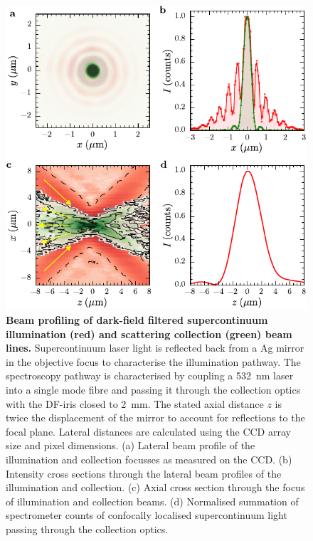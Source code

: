 \documentclass{article}
\begin{document}
\begin{figure}[bt]
\centering
\includegraphics{figures/beam_profile}
\caption[Beam profiling of supercontinuum illumination and scattering collection beam lines.]{\textbf{Beam profiling of dark-field filtered supercontinuum illumination (red) and scattering collection (green) beam lines.} Supercontinuum laser light is reflected back from a Ag mirror in the objective focus to characterise the illumination pathway. The spectroscopy pathway is characterised by coupling a \SI{532}{nm} laser into a single mode fibre and passing it through the collection optics with the DF-iris closed to \SI{2}{mm}. The stated axial distance $z$ is twice the displacement of the mirror to account for reflections to the focal plane. Lateral distances are calculated using the CCD array size and pixel dimensions. (a) Lateral beam profile of the illumination and collection focusses as measured on the CCD. (b) Intensity cross sections through the lateral beam profiles of the illumination and collection. (c) Axial cross section through the focus of illumination and collection beams. (d) Normalised summation of spectrometer counts of confocally localised supercontinuum light passing through the collection optics.}
\label{fig:beam_profile}
\end{figure}
\end{document}

